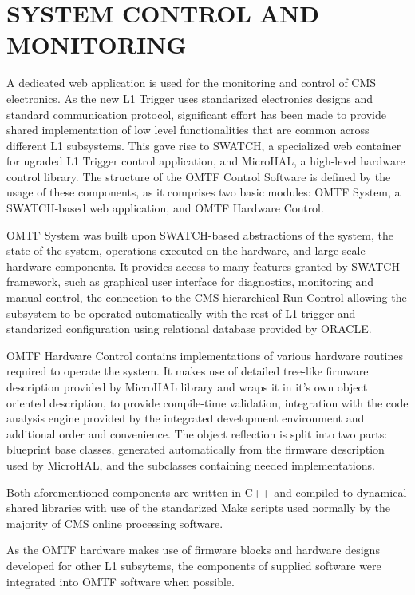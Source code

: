 \section{SYSTEM CONTROL AND MONITORING} 
A dedicated web application is used for the monitoring and control of CMS electronics. As the new L1 Trigger uses standarized electronics designs and standard communication protocol, significant effort has been made to provide shared implementation of low level functionalities that are common across different L1 subsystems.
This gave rise to SWATCH, a specialized web container for ugraded L1 Trigger control application, and MicroHAL, a high-level hardware control library. The structure of the OMTF Control Software is defined by the usage of these components, as it
comprises two basic modules: OMTF System, a SWATCH-based web application, and OMTF Hardware Control.

OMTF System was built upon SWATCH-based abstractions of the system, the state of the system, operations executed on the hardware, and large scale hardware components. It provides access to many features granted by SWATCH framework, such as 
graphical user interface for diagnostics, monitoring and manual control, the connection to the CMS hierarchical Run Control allowing the subsystem to be operated automatically with the rest of L1 trigger and standarized configuration using relational 
database provided by ORACLE.

OMTF Hardware Control contains implementations of various hardware routines required to operate the system. It makes use of detailed tree-like firmware description provided by MicroHAL library and wraps it in it's own object oriented description, to provide
compile-time validation, integration with the code analysis engine provided by the integrated development environment and additional order and convenience. The object reflection is split into two parts: blueprint base classes, generated automatically 
from the firmware description used by MicroHAL, and the subclasses containing needed implementations.

Both aforementioned components are written in C++ and compiled to dynamical shared libraries with use of the standarized Make scripts used normally by the majority of CMS online processing software.

As the OMTF hardware makes use of firmware blocks and hardware designs developed for other L1 subsytems, the components of supplied software were integrated into OMTF software when possible. 

